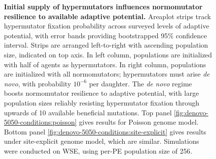 \begin{figure}[h]
  \begin{minipage}{\textwidth}
    \caption{%
      \textbf{Initial supply of hypermutators influences normomutator resilience to available adaptive potential.}
      \footnotesize
      Areaplot strips track hypermutator fixation probability across surveyed levels of adaptive potential, with error bands providing bootstrapped 95\% confidence interval.
      Strips are arranged left-to-right with ascending population size, indicated on top axis.
      In left column, populations are initialized with half of agents as hypermutators.
      In right column, populations are initialized with all normomutators; hypermutators must arise \textit{de novo}, with probability $10^{-6}$ per daughter.
      The \textit{de novo} regime boosts normomutator resilience to adaptive potential, with large population sizes reliably resisting hypermutator fixation through upwards of 10 available beneficial mutations.
      Top panel \ref{fig:denovo-5050-conditions:poisson} gives results for Poisson genome model.
      Bottom panel \ref{fig:denovo-5050-conditions:site-explicit} gives results under site-explicit genome model, which are similar.
      Simulations were conducted on WSE, using per-PE population size of 256.
    }
    \label{fig:denovo-5050-conditions}
  \end{minipage}
\end{figure}
